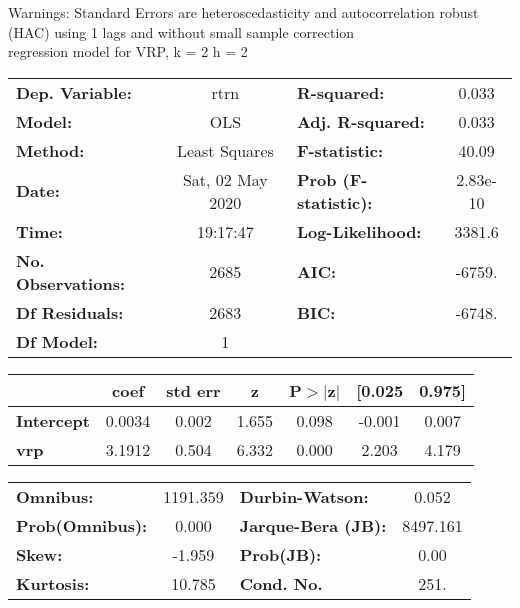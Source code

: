 Warnings: \newline
 [1] Standard Errors are heteroscedasticity and autocorrelation robust (HAC) using 1 lags and without small sample correction\\ 

regression model for VRP, k = 2 h = 2\begin{center}
\begin{tabular}{lclc}
\toprule
\textbf{Dep. Variable:}    &       rtrn       & \textbf{  R-squared:         } &     0.033   \\
\textbf{Model:}            &       OLS        & \textbf{  Adj. R-squared:    } &     0.033   \\
\textbf{Method:}           &  Least Squares   & \textbf{  F-statistic:       } &     40.09   \\
\textbf{Date:}             & Sat, 02 May 2020 & \textbf{  Prob (F-statistic):} &  2.83e-10   \\
\textbf{Time:}             &     19:17:47     & \textbf{  Log-Likelihood:    } &    3381.6   \\
\textbf{No. Observations:} &        2685      & \textbf{  AIC:               } &    -6759.   \\
\textbf{Df Residuals:}     &        2683      & \textbf{  BIC:               } &    -6748.   \\
\textbf{Df Model:}         &           1      & \textbf{                     } &             \\
\bottomrule
\end{tabular}
\begin{tabular}{lcccccc}
                   & \textbf{coef} & \textbf{std err} & \textbf{z} & \textbf{P$> |$z$|$} & \textbf{[0.025} & \textbf{0.975]}  \\
\midrule
\textbf{Intercept} &       0.0034  &        0.002     &     1.655  &         0.098        &       -0.001    &        0.007     \\
\textbf{vrp}       &       3.1912  &        0.504     &     6.332  &         0.000        &        2.203    &        4.179     \\
\bottomrule
\end{tabular}
\begin{tabular}{lclc}
\textbf{Omnibus:}       & 1191.359 & \textbf{  Durbin-Watson:     } &    0.052  \\
\textbf{Prob(Omnibus):} &   0.000  & \textbf{  Jarque-Bera (JB):  } & 8497.161  \\
\textbf{Skew:}          &  -1.959  & \textbf{  Prob(JB):          } &     0.00  \\
\textbf{Kurtosis:}      &  10.785  & \textbf{  Cond. No.          } &     251.  \\
\bottomrule
\end{tabular}
\end{center}

